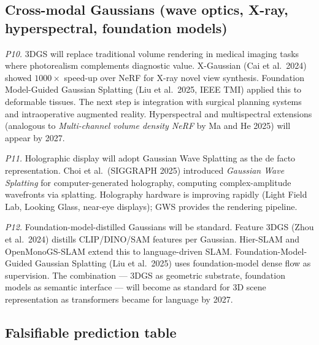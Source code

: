 \documentclass{article}
\begin{document}
\subsection{Cross-modal Gaussians (wave optics, X-ray, hyperspectral, foundation models)}\label{cross-modal-gaussians-wave-optics-x-ray-hyperspectral-foundation-models}

\emph{P10.} 3DGS will replace traditional volume rendering in medical imaging tasks where photorealism complements diagnostic value. X-Gaussian (Cai et al.~2024) showed \(1000\times\) speed-up over NeRF for X-ray novel view synthesis. Foundation Model-Guided Gaussian Splatting (Liu et al.~2025, IEEE TMI) applied this to deformable tissues. The next step is integration with surgical planning systems and intraoperative augmented reality. Hyperspectral and multispectral extensions (analogous to \emph{Multi-channel volume density NeRF} by Ma and He 2025) will appear by 2027.

\emph{P11.} Holographic display will adopt Gaussian Wave Splatting as the de facto representation. Choi et al.~(SIGGRAPH 2025) introduced \emph{Gaussian Wave Splatting} for computer-generated holography, computing complex-amplitude wavefronts via splatting. Holography hardware is improving rapidly (Light Field Lab, Looking Glass, near-eye displays); GWS provides the rendering pipeline.

\emph{P12.} Foundation-model-distilled Gaussians will be standard. Feature 3DGS (Zhou et al.~2024) distills CLIP/DINO/SAM features per Gaussian. Hier-SLAM and OpenMonoGS-SLAM extend this to language-driven SLAM. Foundation-Model-Guided Gaussian Splatting (Liu et al.~2025) uses foundation-model dense flow as supervision. The combination --- 3DGS as geometric substrate, foundation models as semantic interface --- will become as standard for 3D scene representation as transformers became for language by 2027.

\subsection{Falsifiable prediction table}\label{falsifiable-prediction-table}
\end{document}
